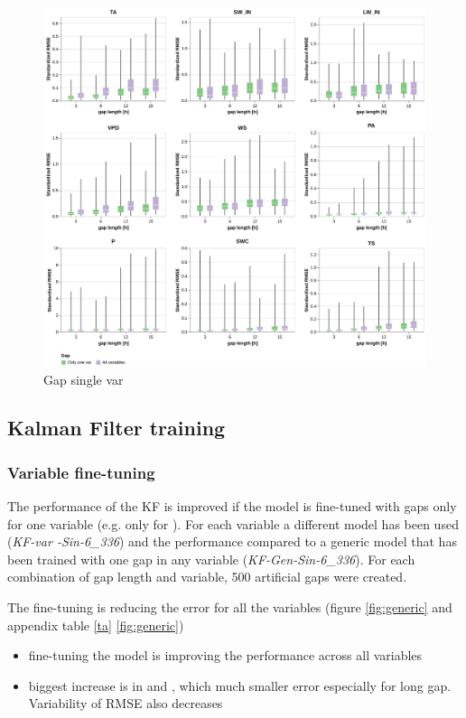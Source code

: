 \documentclass{article}
\newcommand{\imgwidth}{6in}
\let\Oldsubsection\subsection
\renewcommand{\subsection}{\FloatBarrier\Oldsubsection}
\begin{document}
\begin{figure}
\centerline{\includegraphics[width=\imgwidth]{images2/gap_single_var}}
\caption{Gap single var}
\label{fig:gap_single_var}
\end{figure}

\subsection{Kalman Filter training}

\subsubsection{Variable fine-tuning}

The performance of the KF is improved if the model is fine-tuned with gaps only for one variable (e.g. only for ). For each variable a different model has been used (\textit{KF-\textlangle var \textrangle-Sin-6\_336}) and the performance compared to a generic model that has been trained with one gap in any variable (\textit{KF-Gen-Sin-6\_336}). For each combination of gap length and variable, 500 artificial gaps were created.

The fine-tuning is reducing the error for all the variables (figure \ref{fig:generic} and appendix table \ref{ta} \ref{fig:generic})
\begin{itemize}
    \item fine-tuning the model is improving the performance across all variables
    \item biggest increase is in  and , which much smaller error especially for long gap. Variability of RMSE also decreases
\end{itemize}
\end{document}
